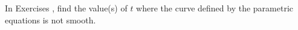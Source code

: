 {\noindent In Exercises}
{, find the value(s) of $t$ where the curve defined by the parametric equations is not smooth.
}

